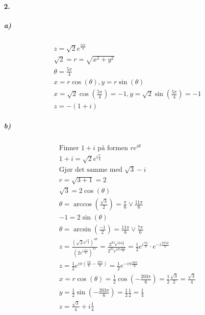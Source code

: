 \documentclass[11pt, A4paper, norsk]{article}
\begin{document}
		\paragraph{2.}
			\subparagraph{a)}
				\begin{gather}
z = \sqrt{2} e^{\frac{5i\pi}{4}} \\
\sqrt{2} = r = \sqrt{x^{2} + y^{2}} \\
\theta = \frac{5\pi}{4} \\
x = r \cos\left( \theta \right) , y = r \sin\left( \theta \right) \\
x = \sqrt{2} \cos \left( \frac{5\pi}{4} \right) = -1 , y = \sqrt{2} \sin \left( \frac{5\pi}{4} \right) = -1 \\
z = -(1 + i)
				\end{gather}
			









			\subparagraph{b)}
				\begin{gather}
\text{Finner $1 + i$ på formen $re^{i\theta}$} \nonumber \\
1 + i = \sqrt{2} e^{i\frac{\pi}{4}} \\
\text{Gjør det samme med $\sqrt{3} - i$} \nonumber \\
r = \sqrt{3 + 1} = 2 \\
\sqrt{3} = 2 \cos \left( \theta \right) \\
\theta = \arccos\left( \frac{\sqrt{3}}{2} \right) = \frac{\pi}{6} \vee \frac{11 \pi}{6} \\
-1 = 2 \sin \left( \theta \right) \\
\theta = \arcsin \left( \frac{-1}{2} \right) = \frac{11 \pi}{6} \vee \frac{7 \pi}{6} \\
z = \frac{\left( \sqrt{2} e^{i \frac{\pi}{4}} \right)^{48}}{\left( 2 e^{i \frac{11 \pi}{6}} \right)^{25}} = \frac{2^{24} e^{i 24 \frac{\pi}{2}}}{2^{25} e^{i 25 \frac{11 \pi}{6}}} = \frac{1}{2} e^{i \frac{72}{6}} \cdot e^{-i\frac{275 \pi}{6}} \\
z = \frac{1}{2} e^{i \pi \left( \frac{72}{6} - \frac{275}{6} \right)} = \frac{1}{2} e^{-i \pi \frac{203}{6}} \\
x = r\cos(\theta) = \frac{1}{2}\cos\left( -\frac{203\pi}{6} \right) = \frac{1}{2} \frac{\sqrt{3}}{2} = \frac{\sqrt{3}}{4} \\
y = \frac{1}{2} \sin \left( -\frac{203 \pi}{6} \right) = \frac{1}{2} \frac{1}{2} = \frac{1}{4} \\
z = \frac{\sqrt{3}}{4} + i\frac{1}{4}
				\end{gather}
\end{document}
